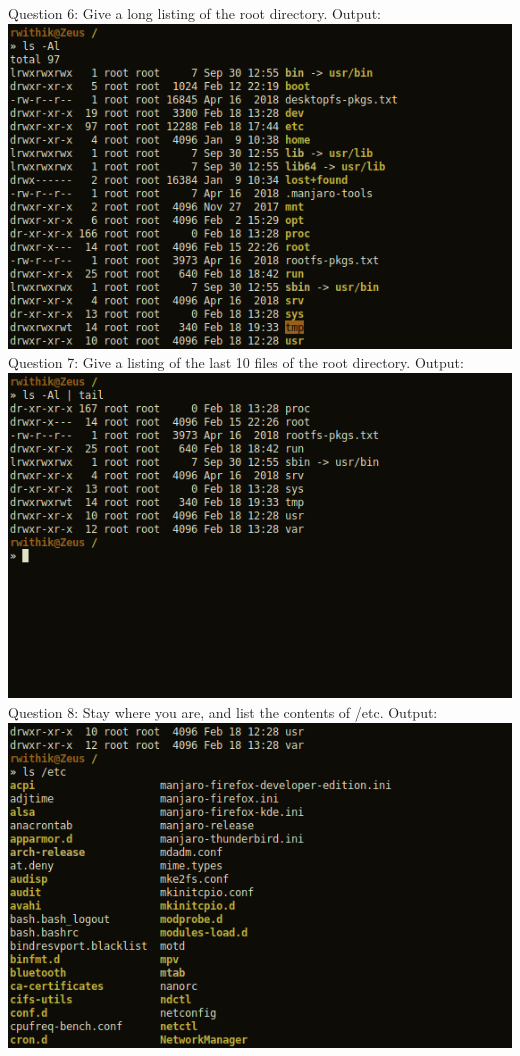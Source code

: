 \documentclass[10pt,a4paper,titlepage]{report}
\begin{document}
\newline
Question 6: Give a long listing of the root directory.\newline
Output:\newline
\includegraphics[scale=.5]{../Images/Cycle2/6.png}\pagebreak
\newline
Question 7: Give a listing of the last 10 files of the root directory.\newline
Output:\newline
\includegraphics[scale=.5]{../Images/Cycle2/7.png}\newline
\newline
Question 8: Stay where you are, and list the contents of /etc.\newline
Output:\newline
\includegraphics[scale=.5]{../Images/Cycle2/8.png}\pagebreak
\end{document}
